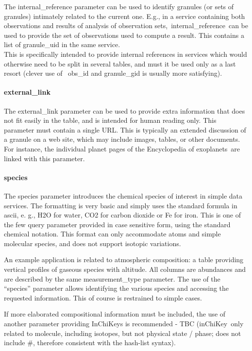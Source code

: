 \documentclass[11pt,a4paper]{ivoa}
\begin{document}
The internal\_reference parameter can be used to identify granules (or sets of granules) intimately related to the current one. E.g., in a service containing both observations and results of analysis of observation sets, internal\_reference can be used to provide the set of observations used to compute a result. This contains a list of granule\_uid in the same service.\\This is specifically intended to provide internal references in services which would otherwise need to be split in several tables, and must it be used only as a last resort (clever use of  obs\_id and granule\_gid is usually more satisfying). 

\paragraph{external\_link}

The external\_link parameter can be used to provide extra information that does not fit easily in the table, and is intended for human reading only. This parameter must contain a single URL. This is typically an extended discussion of a granule on a web site, which may include images, tables, or other documents. For instance, the individual planet pages of the Encyclopedia of exoplanets are linked with this parameter.\\

\paragraph{species}

The species parameter introduces the chemical species of interest in simple data services. The formatting is very basic and simply uses the standard formula in ascii, e. g., H2O for water, CO2 for carbon dioxide or Fe for iron. This is one of the few query parameter provided in case sensitive form, using the standard chemical notation. This format can only accommodate atoms and simple molecular species, and does not support isotopic variations.  

An example application is related to atmospheric composition: a table providing vertical profiles of gaseous species with altitude. All columns are abundances and are described by the same measurement\_type parameter. The use of the ``species'' parameter allows identifying the various species and accessing the requested information. This of course is restrained to simple cases.

If more elaborated compositional information must be included, the use of another parameter providing InChiKeys is recommended - TBC (inChiKey only related to molecule, including isotopes, but not physical state / phase; does not include \#, therefore consistent with the hash-list syntax).\\
\end{document}
